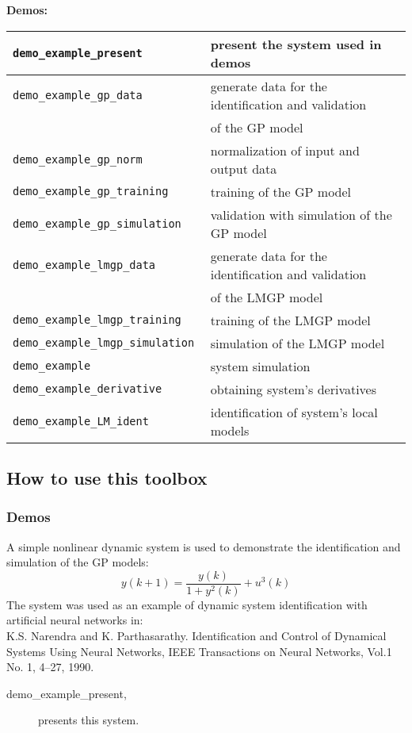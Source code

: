 \documentclass[12pt,twoside]{article}
\newcommand{\fun}[1]{\tt #1}
\begin{document}
{%
\pagebreak
\textbf{Demos:} \\
\begin{tabular}{|l|l|}

 \hline \fun{demo\_example\_present} & present the system used in demos  \\
 \hline \fun{demo\_example\_gp\_data} & generate data for the identification and validation  \\
 & of the GP model \\
 \hline \fun{demo\_example\_gp\_norm} & normalization of input and output data \\
 \hline \fun{demo\_example\_gp\_training} & training of the GP model \\
 \hline \fun{demo\_example\_gp\_simulation} & validation with simulation of the GP model \\
 \hline \fun{demo\_example\_lmgp\_data} & generate data for the identification and validation \\
 &  of the LMGP model \\
 \hline \fun{demo\_example\_lmgp\_training} & training of the LMGP model \\
 \hline \fun{demo\_example\_lmgp\_simulation} & simulation of the LMGP model\\
 \hline \fun{demo\_example} & system simulation\\
 \hline \fun{demo\_example\_derivative} & obtaining system's derivatives\\
 \hline \fun{demo\_example\_LM\_ident} & identification of system's local models \\ \hline
\end{tabular}


} %


\clearpage


\subsection{How to use this toolbox}


\subsubsection{Demos}

A simple nonlinear dynamic system is used to demonstrate the
identification and simulation of the GP models:
 \begin{equation}
 y(k+1) = \frac{y(k)}{1+y^2(k)} + u^3(k) \label{eq:narendra}
 \end{equation}
 The system was used as an example of dynamic system identification
 with artificial neural networks in: \\
 K.S. Narendra and K. Parthasarathy. Identification
 and Control of Dynamical Systems Using Neural Networks,
 IEEE Transactions on Neural Networks, Vol.1 No. 1, 4--27, 1990.
 \begin{description}
 \item [demo\_example\_present,] presents this
 system.
 \end{description}
\end{document}
